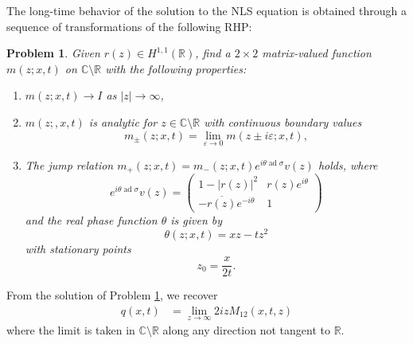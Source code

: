 \documentclass{amsart}
\DeclareMathOperator{\ad}{ad}
\theoremstyle{plain}
\newtheorem{problem}[theorem]{Problem}
\theoremstyle{remark}
\numberwithin{equation}{section}
\newcommand{\bbC}{\mathbb{C}}
\newcommand{\bbR}{\mathbb{R}}
\newcommand{\twomat}[4]
{
\left(
	\begin{array}{cc}
		{#1}	&	{#2}	\\[10pt]
		{#3}	&	{#4}
		\end{array}
\right)
}
\begin{document}
The long-time behavior of the solution to the NLS equation is obtained through a sequence of transformations of the following RHP:
\begin{problem}
\label{prob:NLS.RH0}
Given $r(z) \in H^{1,1}(\bbR)$, 
find a $2\times 2$ matrix-valued function $m(z;x,t)$ on $\bbC \setminus \bbR$ with the following properties:
\begin{enumerate}
\item		$m(z;x,t) \to I$ as $|z| \to \infty$,
			\medskip
			
\item		$m(z;,x,t)$ is analytic for $z \in \mathbb{C} \setminus \bbR$ with continuous boundary values
			$$m_\pm(z;x,t) = \lim_{\varepsilon \to 0} m(z\pm i\varepsilon;x,t),$$
			\medskip
			
\item		
The jump relation $m_+(z;x,t) = m_	-(z;x,t) e^{i\theta \ad \sigma} v(z)$ holds, where
			\begin{equation}
			\label{NLS.V}
			e^{i\theta \ad \sigma} v(z)=\twomat{1-|r(z)|^2}
			{r(z)e^{i\theta}}
   {-\overline{r(z)}e^{-i\theta}}
   {1}
			\end{equation}
and the real phase function $\theta$ is given by
\begin{equation}
\label{NLS.phase}
\theta(z;x,t) = xz-tz^2
\end{equation}
with stationary points
\begin{equation}
    \label{stationary pt}
    z_0={ \dfrac{x}{2t}} .
    \end{equation}
    \end{enumerate}
\end{problem}
From the solution of Problem \ref{prob:NLS.RH0}, we recover
\begin{align}
\label{nls.q}
q(x,t) &= \lim_{z \to \infty} 2 i z M_{12}(x,t,z)
\end{align}
where the limit is taken in $\bbC\setminus \bbR$ along any direction not tangent to $\bbR$.  
\end{document}
